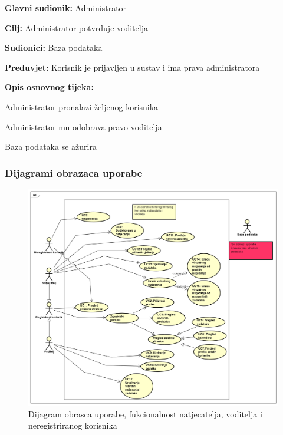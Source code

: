 					\noindent {}
					\begin{packed_item}
						
						\item \textbf{Glavni sudionik: }Administrator
						\item  \textbf{Cilj:} Administrator potvrđuje voditelja 
						\item  \textbf{Sudionici:} Baza podataka
						\item  \textbf{Preduvjet:} Korisnik je prijavljen u sustav i ima prava administratora
						\item  \textbf{Opis osnovnog tijeka:}
						
						\item[] \begin{packed_enum}
							
							\item Administrator pronalazi željenog korisnika
							\item Administrator mu odobrava pravo voditelja
							\item Baza podataka se ažurira
							
						\end{packed_enum}
					\end{packed_item}
					
					\eject
				
					
				\subsubsection{Dijagrami obrazaca uporabe}
					\begin{figure}[H]
						\includegraphics[scale=0.45]{slike/Korisnik_voditelj_natjecatelj.PNG} %
						\centering
						\caption{Dijagram obrasca uporabe, fukcionalnost natjecatelja, voditelja i neregistriranog korisnika}
						\label{fig:obrasci1}
					\end{figure}
					
